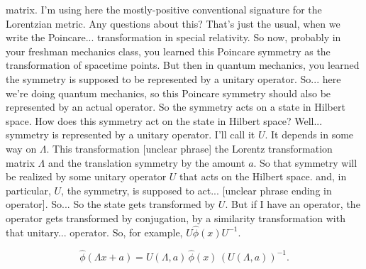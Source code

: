 \noindent
matrix. I'm using here the mostly-positive conventional signature for the Lorentzian metric. Any questions about this? That's just the usual, when we write the Poincare...
transformation in special relativity. So now, probably in your freshman mechanics class, you learned this Poincare symmetry as the transformation of spacetime points. But then in quantum mechanics, you learned the symmetry is supposed to be represented by a unitary operator. So...
here we're doing quantum mechanics, so this Poincare symmetry should also be represented by an actual operator. So the symmetry acts on a state in Hilbert space. How does this symmetry act on the state in Hilbert space? Well...
symmetry is represented by a unitary operator. I'll call it $U$.
It depends in some way on $\Lambda$. This transformation [unclear phrase] the Lorentz transformation matrix $\Lambda$ and the translation symmetry by the amount $a$. So that symmetry will be realized by some unitary operator $U$ that acts on the Hilbert space.
and, in particular, $U$, the symmetry, is supposed to act... [unclear phrase ending in operator]. So...
So the state gets transformed by $U$. But if I have an operator, the operator gets transformed by conjugation, by a similarity transformation with that unitary...
operator. So, for example, $U\hat\phi(x)U^{-1}$.

\[
  \hat\phi(\Lambda x+a)
  =U(\Lambda,a)\,\hat\phi(x)\,(U(\Lambda,a))^{-1}.
\]

